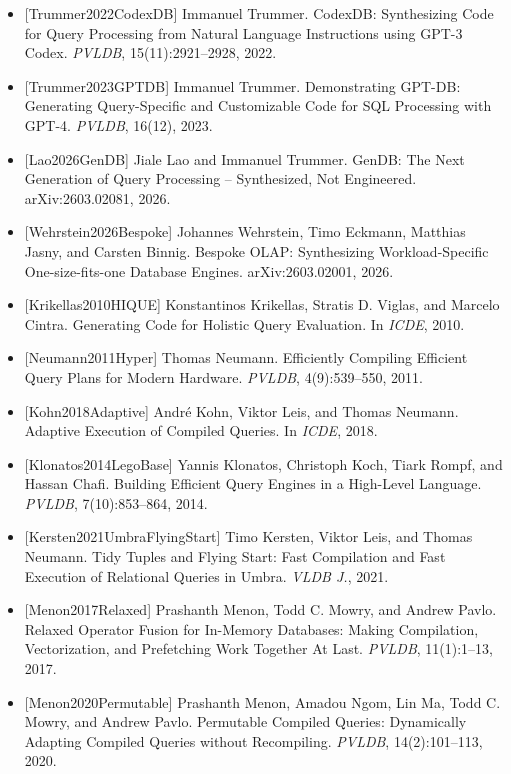 \documentclass[
  10pt,
]{article}
\providecommand{\tightlist}{%
  \setlength{\itemsep}{0pt}\setlength{\parskip}{0pt}}
\begin{document}
\begin{itemize}
\tightlist
\item
  {[}Trummer2022CodexDB{]} Immanuel Trummer. CodexDB: Synthesizing Code
  for Query Processing from Natural Language Instructions using GPT-3
  Codex. \emph{PVLDB}, 15(11):2921--2928, 2022.
\item
  {[}Trummer2023GPTDB{]} Immanuel Trummer. Demonstrating GPT-DB:
  Generating Query-Specific and Customizable Code for SQL Processing
  with GPT-4. \emph{PVLDB}, 16(12), 2023.
\item
  {[}Lao2026GenDB{]} Jiale Lao and Immanuel Trummer. GenDB: The Next
  Generation of Query Processing -- Synthesized, Not Engineered.
  arXiv:2603.02081, 2026.
\item
  {[}Wehrstein2026Bespoke{]} Johannes Wehrstein, Timo Eckmann, Matthias
  Jasny, and Carsten Binnig. Bespoke OLAP: Synthesizing
  Workload-Specific One-size-fits-one Database Engines.
  arXiv:2603.02001, 2026.
\item
  {[}Krikellas2010HIQUE{]} Konstantinos Krikellas, Stratis D. Viglas,
  and Marcelo Cintra. Generating Code for Holistic Query Evaluation. In
  \emph{ICDE}, 2010.
\item
  {[}Neumann2011Hyper{]} Thomas Neumann. Efficiently Compiling Efficient
  Query Plans for Modern Hardware. \emph{PVLDB}, 4(9):539--550, 2011.
\item
  {[}Kohn2018Adaptive{]} André Kohn, Viktor Leis, and Thomas Neumann.
  Adaptive Execution of Compiled Queries. In \emph{ICDE}, 2018.
\item
  {[}Klonatos2014LegoBase{]} Yannis Klonatos, Christoph Koch, Tiark
  Rompf, and Hassan Chafi. Building Efficient Query Engines in a
  High-Level Language. \emph{PVLDB}, 7(10):853--864, 2014.
\item
  {[}Kersten2021UmbraFlyingStart{]} Timo Kersten, Viktor Leis, and
  Thomas Neumann. Tidy Tuples and Flying Start: Fast Compilation and
  Fast Execution of Relational Queries in Umbra. \emph{VLDB J.}, 2021.
\item
  {[}Menon2017Relaxed{]} Prashanth Menon, Todd C. Mowry, and Andrew
  Pavlo. Relaxed Operator Fusion for In-Memory Databases: Making
  Compilation, Vectorization, and Prefetching Work Together At Last.
  \emph{PVLDB}, 11(1):1--13, 2017.
\item
  {[}Menon2020Permutable{]} Prashanth Menon, Amadou Ngom, Lin Ma, Todd
  C. Mowry, and Andrew Pavlo. Permutable Compiled Queries: Dynamically
  Adapting Compiled Queries without Recompiling. \emph{PVLDB},
  14(2):101--113, 2020.

\end{itemize}
\end{document}
